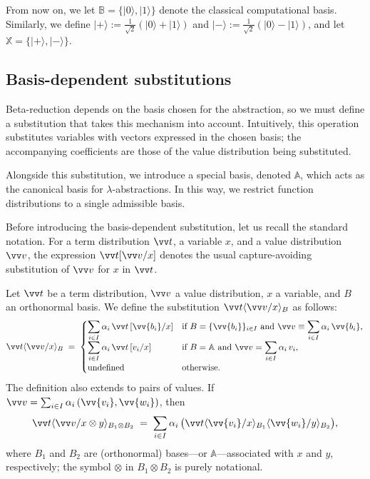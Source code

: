 \documentclass[runningheads,orivec,envcountsame,envcountsect]{llncs}
\newcommand\ket[1]{\ensuremath{|#1\rangle}}
\newcommand\ansubst[2]{\ensuremath{\langle #1 \rangle_{#2}}}
\newcommand\AbsBasis{\ensuremath{\mathbb{A}}}
\def\Pair#1#2{(#1,#2)} %
\def\ds{\displaystyle}
\newcommand\B{\mathbb B}
\newcommand\XB{\mathbb X}
\begin{document}
From now on, we let $\B=\{\ket{0},\ket{1}\}$ denote the classical computational
basis. Similarly, we define
$\ket{+}:=\frac 1{\sqrt{2}}(\ket{0}+\ket{1})$ and
$\ket{-}:=\frac 1{\sqrt{2}}(\ket{0}-\ket{1})$, and let
$\XB=\{\ket{+},\ket{-}\}$.

\subsection{Basis-dependent substitutions}
Beta-reduction depends on the basis chosen for the abstraction, so we must
define a substitution that takes this mechanism into account. Intuitively, this
operation substitutes variables with vectors expressed in the chosen basis; the
accompanying coefficients are those of the value distribution being
substituted.

Alongside this substitution, we introduce a special basis, denoted
$\AbsBasis$, which acts as the canonical basis for $\lambda$-abstractions. In
this way, we restrict function distributions to a single admissible basis.

Before introducing the basis-dependent substitution, let us recall the
standard notation. For a term distribution $\vv t$, a variable $x$, and a
value distribution $\vv v$, the expression $\vv t[\vv v/x]$ denotes the
usual capture-avoiding substitution of $\vv v$ for $x$ in $\vv t$.

\begin{definition}
  Let $\vv t$ be a term distribution, $\vv v$ a value distribution, $x$ a
  variable, and $B$ an orthonormal basis. We define the substitution
  $\vv t\ansubst{\vv v/x}{B}$ as follows:
  \[
    \vv t\ansubst{\vv v/x}{B} \;=\;
    \begin{cases}
      \ds\sum_{i\in I}\alpha_i\,\vv t\,[\vv{b_i}/x] &
        \text{if } B=\{\vv{b_i}\}_{i\in I}\ \text{and}\
        \vv v \equiv \ds\sum_{i\in I}\alpha_i\,\vv{b_i},\\[6pt]
      \ds\sum_{i\in I}\alpha_i\,\vv t\,[v_i/x] &
        \text{if } B=\AbsBasis\ \text{and}\
        \vv v = \ds\sum_{i\in I}\alpha_i\,v_i,\\[2pt]
      \text{undefined} & \text{otherwise.}
    \end{cases}
  \]
  The definition also extends to pairs of values. If
  $\vv v=\sum_{i\in I}\alpha_i\,\Pair{\vv{v_i}}{\vv{w_i}}$, then
  \[
    \vv t\ansubst{\vv v/x\otimes y}{B_1\otimes B_2}
      \;=\; \sum_{i\in I}\alpha_i\,
      \bigl(\vv t\ansubst{\vv{v_i}/x}{B_1}\ansubst{\vv{w_i}/y}{B_2}\bigr),
  \]
  where $B_1$ and $B_2$ are (orthonormal) bases---or $\AbsBasis$---associated
  with $x$ and $y$, respectively; the symbol $\otimes$ in $B_1\otimes B_2$ is
  purely notational.
\end{definition}
\end{document}
